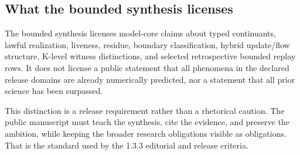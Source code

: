 \subsection{What the bounded synthesis licenses}

The bounded synthesis licenses model-core claims about typed continuants, lawful realization, liveness, residue, boundary classification, hybrid update/flow structure, K-level witness distinctions, and selected retrospective bounded replay rows. It does not license a public statement that all phenomena in the declared release domains are already numerically predicted, nor a statement that all prior science has been surpassed.


This distinction is a release requirement rather than a rhetorical caution. The public manuscript must teach the synthesis, cite the evidence, and preserve the ambition, while keeping the broader research obligations visible as obligations. That is the standard used by the 1.3.3 editorial and release criteria.
